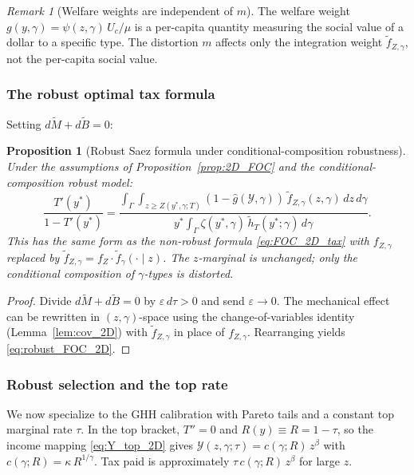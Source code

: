 \documentclass[12pt,a4paper]{article}
\theoremstyle{definition}
\theoremstyle{plain}
\newtheorem{proposition}{Proposition}[section]
\theoremstyle{remark}
\newtheorem{remark}{Remark}[section]
\newcommand{\calY}{\mathcal{Y}}
\begin{document}
\begin{remark}[Welfare weights are independent of $m$]
\label{rem:weights_2D}
The welfare weight $g(y,\gamma) = \psi(z,\gamma)\,U_c/\mu$ is a per-capita quantity measuring the social value of a dollar to a specific type.  The distortion $m$ affects only the integration weight $\widetilde{f}_{Z,\gamma}$, not the per-capita social value.
\end{remark}

\subsubsection{The robust optimal tax formula}

Setting $d\widetilde{M} + d\widetilde{B} = 0$:

\begin{proposition}[Robust Saez formula under conditional-composition robustness]
\label{prop:robust_2D}
Under the assumptions of Proposition~\ref{prop:2D_FOC} and the conditional-composition robust model:
\begin{equation}
\label{eq:robust_FOC_2D}
  \frac{T'(y^*)}{1-T'(y^*)}
  = \frac{\displaystyle\int_{\Gamma}\int_{z \geq Z(y^*,\gamma;T)} (1 - \hat{g}(\calY,\gamma))\,\widetilde{f}_{Z,\gamma}(z,\gamma)\,dz\,d\gamma}
  {\displaystyle y^*\int_{\Gamma}\zeta(y^*,\gamma)\,\widetilde{h}_T(y^*;\gamma)\,d\gamma}.
\end{equation}
This has the same form as the non-robust formula \eqref{eq:FOC_2D_tax} with $f_{Z,\gamma}$ replaced by $\widetilde{f}_{Z,\gamma} = f_Z \cdot \widetilde{f}_{\gamma}(\cdot \mid z)$.  The $z$-marginal is unchanged; only the conditional composition of $\gamma$-types is distorted.
\end{proposition}

\begin{proof}
Divide $d\widetilde{M} + d\widetilde{B} = 0$ by $\varepsilon\,d\tau > 0$ and send $\varepsilon \to 0$.  The mechanical effect can be rewritten in $(z,\gamma)$-space using the change-of-variables identity (Lemma~\ref{lem:cov_2D}) with $\widetilde{f}_{Z,\gamma}$ in place of $f_{Z,\gamma}$.  Rearranging yields \eqref{eq:robust_FOC_2D}.
\end{proof}


\subsubsection{Robust selection and the top rate}
\label{sec:2D_robust_selection}

We now specialize to the GHH calibration with Pareto tails and a constant top marginal rate $\tau$.  In the top bracket, $T'' = 0$ and $R(y) \equiv R = 1-\tau$, so the income mapping \eqref{eq:Y_top_2D} gives $\calY(z,\gamma;\tau) = c(\gamma;R)\,z^{\beta}$ with $c(\gamma;R) = \kappa\,R^{1/\gamma}$.  Tax paid is approximately $\tau\,c(\gamma;R)\,z^{\beta}$ for large $z$.
\end{document}
